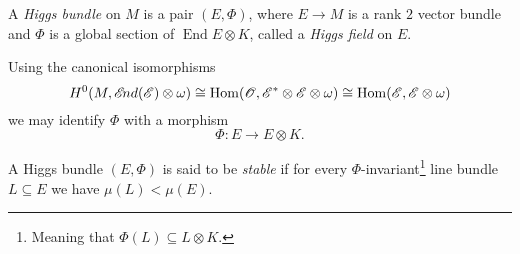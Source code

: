 \documentclass[A4paper, 12pt, british, reqno]{amsart}
\DeclareMathOperator{\Hom}{Hom}
\DeclareMathOperator{\End}{End}
\newcommand{\ot}{\otimes}
\newcommand{\op}{\oplus}
\newcommand{\dual}{^{*}}
\begin{document}
%
%
%

\begin{defn}
    A \textit{Higgs bundle} on $M$ is a pair $(E,\Phi)$, where $E\to M$ is a rank $2$ vector bundle and $\Phi$ is a global section of $\End{E}\ot K$, called a \textit{Higgs field} on $E$.
\end{defn}

\begin{rem}
    Using the canonical isomorphisms
    \[ H^{0}(M,\sEnd(\E)\ot \w)\cong \Hom(\O,\E\dual \ot \E\ot \w)\cong \Hom(\E,\E\ot \w) \]
    we may identify $\Phi$ with a morphism
    \[ \Phi\colon E\to E\ot K. \]
\end{rem}



\begin{defn}[Stability]
A Higgs bundle $(E,\Phi)$ is said to be \textit{stable} if for every $\Phi$-invariant\footnote{Meaning that $\Phi(L)\subseteq L\ot K$.} line bundle $L\subseteq E$ we have $\mu(L)<\mu(E)$.
\end{defn}
\end{document}
